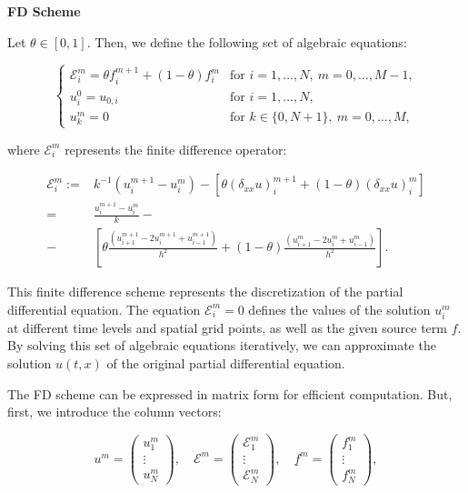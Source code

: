 \textbf{FD Scheme}

Let $\theta \in [0, 1]$. Then, we define the following set of algebraic equations:

\[
\begin{cases}
\mathcal{E}^{m}_{i} = \theta f^{m+1}_{i} + (1 - \theta) f^{m}_{i} & \text{for } i = 1, \ldots, N, \ m = 0, \ldots, M-1, \\
u^{0}_{i} = u_{0,i} & \text{for } i = 1, \ldots, N, \\
u^{m}_{k} = 0 & \text{for } k \in \{0, N+1\}, \ m = 0, \ldots, M,
\end{cases}
\]

where $\mathcal{E}^{m}_{i}$ represents the finite difference operator:

\begin{align*}
\mathcal{E}^{m}_{i} := & k^{-1} (u^{m+1}_{i} - u^{m}_{i}) - [\theta(\delta_{xx}u)^{m+1}_{i} + (1 - \theta)(\delta_{xx}u)^{m}_{i}] \\
= & \frac{u^{m+1}_{i} - u^{m}_{i}}{k} - \\
- & \left[\theta \frac{(u^{m+1}_{i+1} - 2u^{m+1}_{i} + u^{m+1}_{i-1})}{h^2} + (1 - \theta) \frac{(u^{m}_{i+1} - 2u^{m}_{i} + u^{m}_{i-1})}{h^2} \right].
\end{align*}

This finite difference scheme represents the discretization of the partial differential equation. The equation $\mathcal{E}^{m}_{i} = 0$ defines the values of the solution $u^{m}_{i}$ at different time levels and spatial grid points, as well as the given source term $f$. By solving this set of algebraic equations iteratively, we can approximate the solution $u(t, x)$ of the original partial differential equation.


The FD scheme can be expressed in matrix form for efficient computation. But, first, we introduce the column vectors:

\[
u^{m} = \begin{pmatrix}
u^{m}_{1} \\
\vdots \\
u^{m}_{N}
\end{pmatrix}, \quad
\mathcal{E}^{m} = \begin{pmatrix}
\mathcal{E}^{m}_{1} \\
\vdots \\
\mathcal{E}^{m}_{N}
\end{pmatrix}, \quad
\underline{f}^{m} = \begin{pmatrix}
f^{m}_{1} \\
\vdots \\
f^{m}_{N}
\end{pmatrix},
\]

